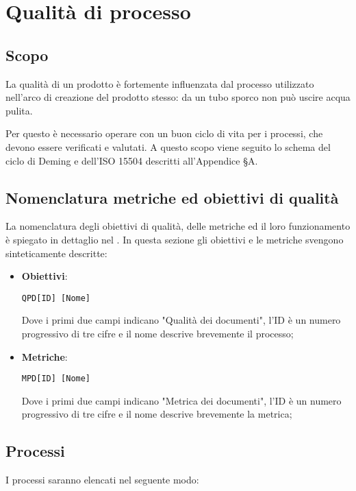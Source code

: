 \section{Qualità di processo}\label{QualitaProcesso}

\subsection{Scopo}
La qualità di un prodotto è fortemente influenzata dal processo utilizzato nell'arco di creazione del prodotto stesso: da un tubo sporco non può uscire acqua pulita.

Per questo è necessario operare con un buon ciclo di vita per i processi, che devono essere verificati e valutati. A questo scopo viene seguito lo schema del ciclo di Deming e dell'ISO 15504 descritti all'Appendice §A.

\subsection{Nomenclatura metriche ed obiettivi di qualità}
La nomenclatura degli obiettivi di qualità, delle metriche ed il loro funzionamento è spiegato in dettaglio nel \Doc{\NdPv}. In questa sezione gli obiettivi e le metriche svengono sinteticamente descritte:

\begin{itemize}
	\item \textbf{Obiettivi}: 
	
	\begin{center}
	\texttt{QPD[ID] [Nome]}
	\end{center} 

	Dove i primi due campi indicano "Qualità dei documenti", l'ID è un numero progressivo di tre cifre e il nome descrive brevemente il processo;
	\item \textbf{Metriche}:
	
	\begin{center}
		\texttt{MPD[ID] [Nome]}
	\end{center}
	
	Dove i primi due campi indicano "Metrica dei documenti", l'ID è un numero progressivo di tre cifre e il nome descrive brevemente la metrica;
\end{itemize}

\subsection{Processi}
I processi saranno elencati nel seguente modo:

